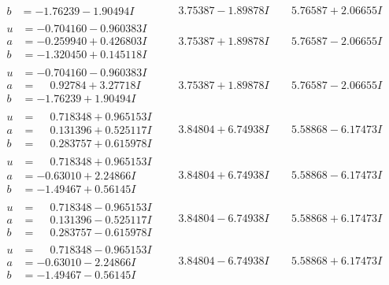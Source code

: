 \documentclass[1p]{elsarticle_modified}
\theoremstyle{definition}
\begin{document}
$$\begin{array}{c|c|c}
\begin{aligned}
b &= -1.76239 - 1.90494 I\end{aligned}
 & \phantom{-}3.75387 - 1.89878 I & \phantom{-}5.76587 + 2.06655 I \\ \hline\begin{aligned}
u &= -0.704160 - 0.960383 I \\
a &= -0.259940 + 0.426803 I \\
b &= -1.320450 + 0.145118 I\end{aligned}
 & \phantom{-}3.75387 + 1.89878 I & \phantom{-}5.76587 - 2.06655 I \\ \hline\begin{aligned}
u &= -0.704160 - 0.960383 I \\
a &= \phantom{-}0.92784 + 3.27718 I \\
b &= -1.76239 + 1.90494 I\end{aligned}
 & \phantom{-}3.75387 + 1.89878 I & \phantom{-}5.76587 - 2.06655 I \\ \hline\begin{aligned}
u &= \phantom{-}0.718348 + 0.965153 I \\
a &= \phantom{-}0.131396 + 0.525117 I \\
b &= \phantom{-}0.283757 + 0.615978 I\end{aligned}
 & \phantom{-}3.84804 + 6.74938 I & \phantom{-}5.58868 - 6.17473 I \\ \hline\begin{aligned}
u &= \phantom{-}0.718348 + 0.965153 I \\
a &= -0.63010 + 2.24866 I \\
b &= -1.49467 + 0.56145 I\end{aligned}
 & \phantom{-}3.84804 + 6.74938 I & \phantom{-}5.58868 - 6.17473 I \\ \hline\begin{aligned}
u &= \phantom{-}0.718348 - 0.965153 I \\
a &= \phantom{-}0.131396 - 0.525117 I \\
b &= \phantom{-}0.283757 - 0.615978 I\end{aligned}
 & \phantom{-}3.84804 - 6.74938 I & \phantom{-}5.58868 + 6.17473 I \\ \hline\begin{aligned}
u &= \phantom{-}0.718348 - 0.965153 I \\
a &= -0.63010 - 2.24866 I \\
b &= -1.49467 - 0.56145 I\end{aligned}
 & \phantom{-}3.84804 - 6.74938 I & \phantom{-}5.58868 + 6.17473 I \\ \hline\begin{aligned}

\end{aligned}
\end{array}$$
\end{document}
